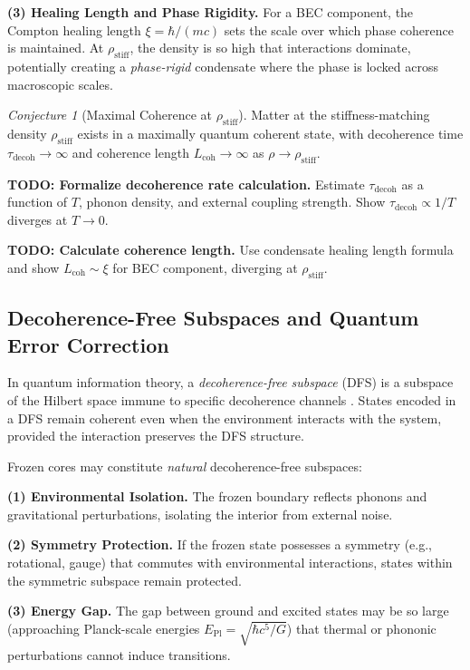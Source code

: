 \documentclass[11pt,a4paper]{article}
\newcommand{\rhostiff}{\ensuremath{\rho_{\mathrm{stiff}}}}
\newcommand{\xihealing}{\ensuremath{\xi}}
\newcommand{\taudecoh}{\ensuremath{\tau_{\mathrm{decoh}}}}
\newcommand{\Lcoh}{\ensuremath{L_{\mathrm{coh}}}}
\theoremstyle{definition}
\theoremstyle{remark}
\newtheorem{conjecture}[theorem]{Conjecture}
\begin{document}
\textbf{(3) Healing Length and Phase Rigidity.} For a BEC component, the Compton healing length $\xihealing = \hbar/(mc)$ sets the scale over which phase coherence is maintained. At $\rhostiff$, the density is so high that interactions dominate, potentially creating a \emph{phase-rigid} condensate where the phase is locked across macroscopic scales.

\begin{conjecture}[Maximal Coherence at $\rhostiff$]
\label{conj:maximal_coherence}
Matter at the stiffness-matching density $\rhostiff$ exists in a maximally quantum coherent state, with decoherence time $\taudecoh \to \infty$ and coherence length $\Lcoh \to \infty$ as $\rho \to \rhostiff$.
\end{conjecture}

\textbf{TODO: Formalize decoherence rate calculation.} Estimate $\taudecoh$ as a function of $T$, phonon density, and external coupling strength. Show $\taudecoh \propto 1/T$ diverges at $T \to 0$.

\textbf{TODO: Calculate coherence length.} Use condensate healing length formula and show $\Lcoh \sim \xihealing$ for BEC component, diverging at $\rhostiff$.

\subsection{Decoherence-Free Subspaces and Quantum Error Correction}
\label{sec:decoherence_free}

In quantum information theory, a \emph{decoherence-free subspace} (DFS) is a subspace of the Hilbert space immune to specific decoherence channels \cite{Lidar1998,Zanardi1997}. States encoded in a DFS remain coherent even when the environment interacts with the system, provided the interaction preserves the DFS structure.

Frozen cores may constitute \emph{natural} decoherence-free subspaces:

\textbf{(1) Environmental Isolation.} The frozen boundary reflects phonons and gravitational perturbations, isolating the interior from external noise.

\textbf{(2) Symmetry Protection.} If the frozen state possesses a symmetry (e.g., rotational, gauge) that commutes with environmental interactions, states within the symmetric subspace remain protected.

\textbf{(3) Energy Gap.} The gap between ground and excited states may be so large (approaching Planck-scale energies $E_{\mathrm{Pl}} = \sqrt{\hbar c^5/G}$) that thermal or phononic perturbations cannot induce transitions.
\end{document}
